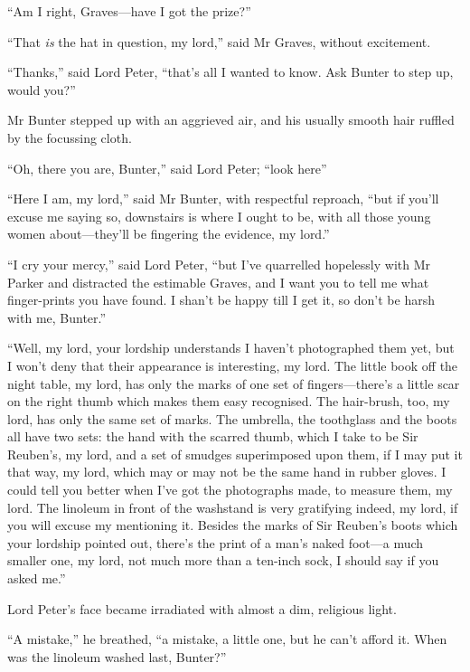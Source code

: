 \enquote{Am I right, Graves\allowbreak---\allowbreak have I got the prize?}

\enquote{That \textit{is} the hat in question, my lord,} said Mr Graves, without excitement.

\enquote{Thanks,} said Lord Peter, \enquote{that’s all I wanted to know. Ask Bunter to step up, would you?}

Mr Bunter stepped up with an aggrieved air, and his usually smooth hair ruffled by the focussing cloth.

\enquote{Oh, there you are, Bunter,} said Lord Peter; \enquote{look here\longdash}

\enquote{Here I am, my lord,} said Mr Bunter, with respectful reproach, \enquote{but if you’ll excuse me saying so, downstairs is where I ought to be, with all those young women about\allowbreak---\allowbreak they’ll be fingering the evidence, my lord.}

\enquote{I cry your mercy,} said Lord Peter, \enquote{but I’ve quarrelled hopelessly with Mr Parker and distracted the estimable Graves, and I want you to tell me what finger-prints you have found. I shan’t be happy till I get it, so don’t be harsh with me, Bunter.}

\enquote{Well, my lord, your lordship understands I haven’t photographed them yet, but I won’t deny that their appearance is interesting, my lord. The little book off the night table, my lord, has only the marks of one set of fingers\allowbreak---\allowbreak there’s a little scar on the right thumb which makes them easy recognised. The hair-brush, too, my lord, has only the same set of marks. The umbrella, the toothglass and the boots all have two sets: the hand with the scarred thumb, which I take to be Sir Reuben’s, my lord, and a set of smudges superimposed upon them, if I may put it that way, my lord, which may or may not be the same hand in rubber gloves. I could tell you better when I’ve got the photographs made, to measure them, my lord. The linoleum in front of the washstand is very gratifying indeed, my lord, if you will excuse my mentioning it. Besides the marks of Sir Reuben’s boots which your lordship pointed out, there’s the print of a man’s naked foot\allowbreak---\allowbreak a much smaller one, my lord, not much more than a ten-inch sock, I should say if you asked me.}

Lord Peter’s face became irradiated with almost a dim, religious light.

\enquote{A mistake,} he breathed, \enquote{a mistake, a little one, but he can’t afford it. When was the linoleum washed last, Bunter?}

